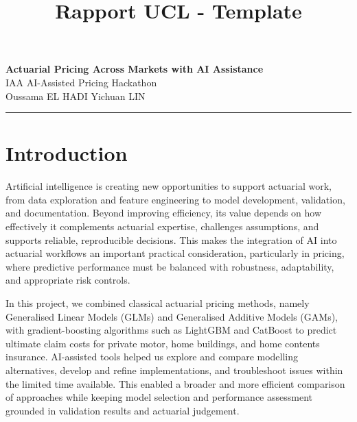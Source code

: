 \documentclass{rapport}
\title{Rapport UCL - Template} %
\begin{document}







\fairemarges %
\newpage


\begin{center}
    {\Large\bfseries Actuarial Pricing Across Markets with AI Assistance}\\[0.2cm]
    {\large IAA AI-Assisted Pricing Hackathon}\\[0.1cm]
    {\normalsize Oussama \textsc{EL HADI} \quad
    Yichuan \textsc{LIN}}
\end{center}

\vspace{0.2cm}
\hrule
\vspace{0.2cm}


\section{Introduction}


Artificial intelligence is creating new opportunities to support actuarial work, from data exploration and feature engineering to model development, validation, and documentation. Beyond improving efficiency, its value depends on how effectively it complements actuarial expertise, challenges assumptions, and supports reliable, reproducible decisions. This makes the integration of AI into actuarial workflows an important practical consideration, particularly in pricing, where predictive performance must be balanced with robustness, adaptability, and appropriate risk controls.

In this project, we combined classical actuarial pricing methods, namely Generalised Linear Models (GLMs) and Generalised Additive Models (GAMs), with gradient-boosting algorithms such as LightGBM and CatBoost to predict ultimate claim costs for private motor, home buildings, and home contents insurance. AI-assisted tools helped us explore and compare modelling alternatives, develop and refine implementations, and troubleshoot issues within the limited time available. This enabled a broader and more efficient comparison of approaches while keeping model selection and performance assessment grounded in validation results and actuarial judgement.
\end{document}

